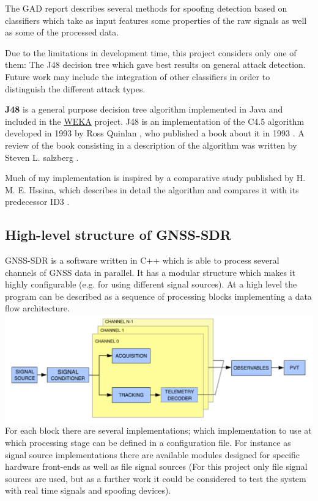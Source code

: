 \documentclass[a4paper]{usiinfbachelorproject}
\begin{document}
The GAD report describes several methods for spoofing detection based on classifiers which take as input features 
some properties of the raw signals as well as some of the processed data.

Due to the limitations in development time, this project considers only one
of them: The J48 decision tree which gave best results on general attack detection.
 Future work may include the integration of other classifiers in order to distinguish the different attack types.

\textbf{J48} is a general purpose decision tree algorithm implemented in Java and included in the \href{https://www.cs.waikato.ac.nz/ml/weka/index.html}{WEKA}
project. J48 is an implementation of the C4.5 algorithm developed in 1993 by Ross Quinlan \cite{QUINLAN}, 
who published a book about it in 1993 . A review of the book consisting in a description of the algorithm was written by Steven L. salzberg \cite{SALZBERG}.

Much of my implementation is inspired by a comparative study published
by H. M. E. Hssina, which describes in detail the algorithm and compares it with its predecessor ID3 \cite{HSSINA}.




	\subsection{\textbf{High-level structure of GNSS-SDR}}
	
GNSS-SDR is a software written in C++ which is able to process several channels of GNSS data in parallel. It
has a modular structure which makes it highly configurable (e.g. for using different signal sources). At a high level
the program can be described as a sequence of processing blocks implementing a data flow architecture. \\

\includegraphics[width=.8\linewidth]{figures/gnss_structure} \\

For each block there are several implementations; which implementation to use at which processing stage can
be defined in a configuration file. For instance as signal source implementations there are available modules
designed for specific hardware front-ends as well as file signal sources (For this project
only file signal sources are used, but as a further work it could be considered to test the system with real time signals and spoofing devices).
\end{document}
